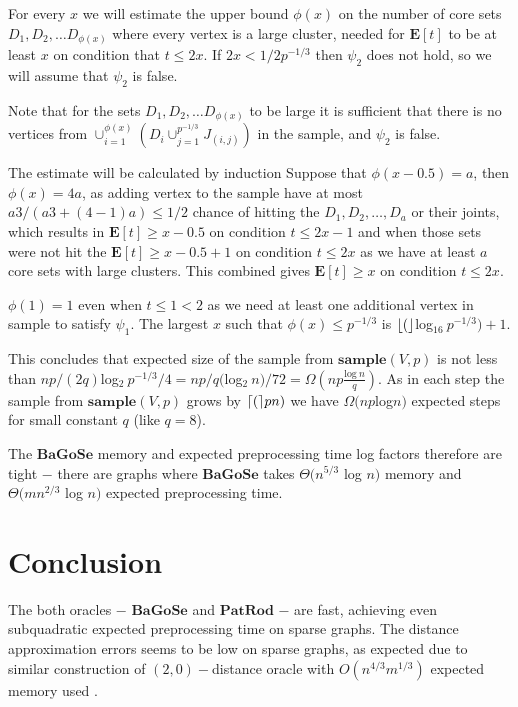 \documentclass[shortabstract, lic, english]{iithesis}
\theoremstyle{definition} \newtheorem{definition}{Definition}[chapter]
\theoremstyle{plain} \newtheorem{remark}[definition]{Observation}
\theoremstyle{plain} \newtheorem{theorem}[definition]{Theorem}
\theoremstyle{plain} \newtheorem{lemma}[definition]{Lemma}
\theoremstyle{plain} \newtheorem{conjecture}[definition]{Conjecture}
\DeclarePairedDelimiter{\ceil}{\lceil}{\rceil}
\DeclarePairedDelimiter{\floor}{\lfloor}{\rfloor}
\begin{document}
For every $x$ we will estimate the upper bound $\phi(x)$ on the number of core sets $D_1, D_2, \ldots D_{\phi(x)}$ where every vertex is a large cluster, needed for $\mathbf{E}[t]$ to be at least $x$ on condition that $t \leq 2x$.
If $2x < 1/2  p^{-1/3}$ then $\psi_2$ does not hold, so we will assume that $\psi_2$ is false.

Note that for the sets $D_1, D_2, \ldots D_{\phi(x)}$ to be large it is sufficient that there is no vertices from $\cup_{i=1}^{\phi(x)}(D_i \cup_{j=1}^{p^{-1/3}} J_{(i, j)})$ in the sample, and $\psi_2$ is false.

The estimate will be calculated by induction
Suppose that $\phi(x - 0.5) = a$, then $\phi(x) = 4a$, as adding vertex to the sample have at most $a  3 / (a  3 + (4-1)a) \leq 1/2$ chance of hitting the $D_1, D_2, \ldots, D_a$ or their joints, which results in $\mathbf{E}[t] \geq x - 0.5$ on condition $t \leq 2x - 1$ and
when those sets were not hit the $\mathbf{E}[t] \geq x - 0.5 + 1$ on condition $t \leq 2x$ as we have at least $a$ core sets with large clusters. This combined gives $\mathbf{E}[t] \geq x$ on condition $t \leq 2x$.

$\phi(1) = 1$ even when $t \leq 1 < 2$ as we need at least one additional vertex in sample to satisfy $\psi_1$.
The largest $x$ such that $\phi(x) \leq p^{-1/3}$ is $\floor($log$_{16}~p^{-1/3}) + 1$.

This concludes that expected size of the sample from $\mathbf{sample}(V, p)$ is not less than
$np/(2q)  $log$_2~p^{-1/3}/4 = np/q  ($log$_2~ n)/72 = \Omega(np  \frac{\text{log}~n}{q})$.
As in each step the sample from $\mathbf{sample}(V, p)$ grows by $\ceil(pn)$ we have $\Omega(np $log$ n)$ expected steps for small constant $q$ (like $q = 8$).

The $\mathbf{BaGoSe}$ memory and expected preprocessing time log factors therefore are tight $-$ there are graphs where $\mathbf{BaGoSe}$ takes $\Theta(n^{5/3} $ log $n)$ memory and $\Theta(mn^{2/3} $ log $n)$ expected preprocessing time.


\section{Conclusion}
The both oracles $-$ $\mathbf{BaGoSe}$ and $\mathbf{PatRod}$ $-$ are fast, achieving even subquadratic expected preprocessing time on sparse graphs.
The distance approximation errors seems to be low on sparse graphs, as expected due to similar construction of $(2,0)-$distance oracle with $O(n^{4/3}m^{1/3})$ expected memory used \cite{21OracleLessMemory}.
\end{document}
